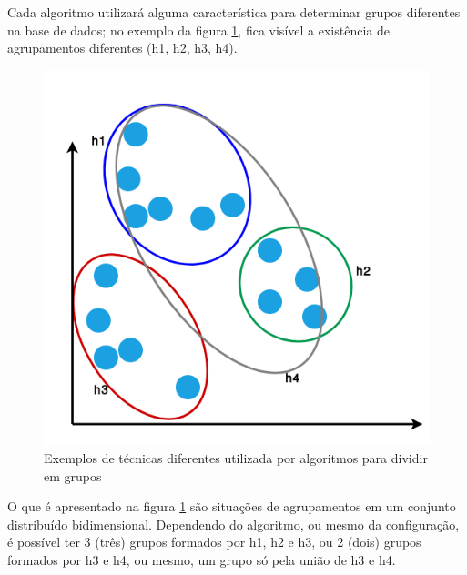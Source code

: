 Cada algoritmo utilizará alguma característica para determinar grupos diferentes na base de dados; no exemplo da figura \ref{fig:planoCartesianoAprendNSup}, fica visível a existência de agrupamentos diferentes (h1, h2, h3, h4). 

\begin{figure}[h!]
    \centering
    \includegraphics[scale=0.4]{figs/amostra_dados_AprendNSuperv.png}
    
    
    \caption{Exemplos de técnicas diferentes utilizada por algoritmos para dividir em grupos} 
    \label{fig:planoCartesianoAprendNSup}     
\end{figure}


 

O que é apresentado na figura \ref{fig:planoCartesianoAprendNSup} são situações de agrupamentos em um conjunto distribuído bidimensional. Dependendo do algoritmo, ou mesmo da configuração, é possível ter 3 (três) grupos formados por h1, h2 e h3, ou 2 (dois) grupos formados por h3 e h4, ou mesmo, um grupo só pela união de h3 e h4. 


